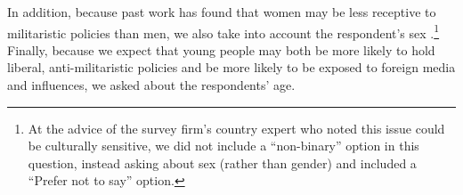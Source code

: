 In addition, because past work has found that women may be less receptive to militaristic policies than men, we also take into account the respondent's sex \cite{allen2020,allen2023}.\footnote{At the advice of the survey firm's country expert who noted this issue could be culturally sensitive, we did not include a ``non-binary'' option in this question, instead asking about sex (rather than gender) and included a ``Prefer not to say'' option.} Finally, because we expect that young people may both be more likely to hold liberal, anti-militaristic policies and be more likely to be exposed to foreign media and influences, we asked about the respondents' age. 



